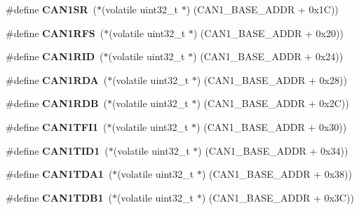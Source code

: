 \begin{DoxyCompactItemize}
\#define {\bfseries C\+A\+N1\+SR}~($\ast$(volatile uint32\+\_\+t $\ast$) (C\+A\+N1\+\_\+\+B\+A\+S\+E\+\_\+\+A\+D\+DR + 0x1\+C))
\item 
\mbox{\label{group__lpc24xx__regs_gac300bdbceacd0b9a7213fa01160ede7c}} 
\#define {\bfseries C\+A\+N1\+R\+FS}~($\ast$(volatile uint32\+\_\+t $\ast$) (C\+A\+N1\+\_\+\+B\+A\+S\+E\+\_\+\+A\+D\+DR + 0x20))
\item 
\mbox{\label{group__lpc24xx__regs_ga135719b2cee06c3a8cd2d940d5e6dd4e}} 
\#define {\bfseries C\+A\+N1\+R\+ID}~($\ast$(volatile uint32\+\_\+t $\ast$) (C\+A\+N1\+\_\+\+B\+A\+S\+E\+\_\+\+A\+D\+DR + 0x24))
\item 
\mbox{\label{group__lpc24xx__regs_ga985037c68b423691a79c99bd98b3c14c}} 
\#define {\bfseries C\+A\+N1\+R\+DA}~($\ast$(volatile uint32\+\_\+t $\ast$) (C\+A\+N1\+\_\+\+B\+A\+S\+E\+\_\+\+A\+D\+DR + 0x28))
\item 
\mbox{\label{group__lpc24xx__regs_ga5db7175ec9a3ff6197b36b6e8e8fc8e8}} 
\#define {\bfseries C\+A\+N1\+R\+DB}~($\ast$(volatile uint32\+\_\+t $\ast$) (C\+A\+N1\+\_\+\+B\+A\+S\+E\+\_\+\+A\+D\+DR + 0x2\+C))
\item 
\mbox{\label{group__lpc24xx__regs_ga3bc3b781b112b9c401048513b22f6794}} 
\#define {\bfseries C\+A\+N1\+T\+F\+I1}~($\ast$(volatile uint32\+\_\+t $\ast$) (C\+A\+N1\+\_\+\+B\+A\+S\+E\+\_\+\+A\+D\+DR + 0x30))
\item 
\mbox{\label{group__lpc24xx__regs_ga84bce3c4d946adefddf7fd2f53039099}} 
\#define {\bfseries C\+A\+N1\+T\+I\+D1}~($\ast$(volatile uint32\+\_\+t $\ast$) (C\+A\+N1\+\_\+\+B\+A\+S\+E\+\_\+\+A\+D\+DR + 0x34))
\item 
\mbox{\label{group__lpc24xx__regs_ga1c8986ef45e105cf11df5dfafda8fa99}} 
\#define {\bfseries C\+A\+N1\+T\+D\+A1}~($\ast$(volatile uint32\+\_\+t $\ast$) (C\+A\+N1\+\_\+\+B\+A\+S\+E\+\_\+\+A\+D\+DR + 0x38))
\item 
\mbox{\label{group__lpc24xx__regs_gaea7e5217be766a28333909cfd9cd4b6d}} 
\#define {\bfseries C\+A\+N1\+T\+D\+B1}~($\ast$(volatile uint32\+\_\+t $\ast$) (C\+A\+N1\+\_\+\+B\+A\+S\+E\+\_\+\+A\+D\+DR + 0x3\+C))

\end{DoxyCompactItemize}
